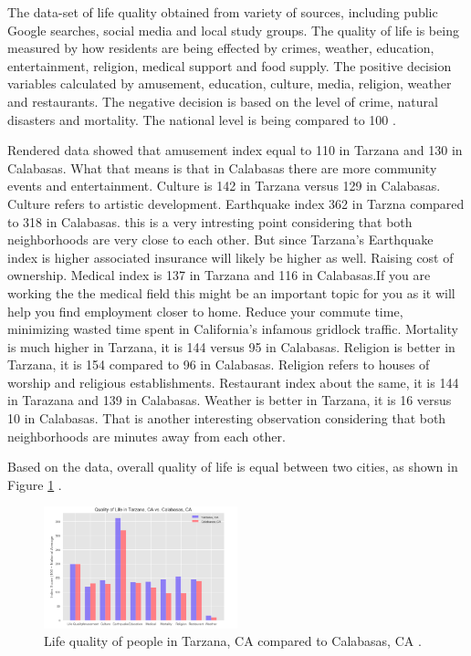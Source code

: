 \documentclass[sigconf]{acmart}
\begin{document}
The data-set of life quality obtained from variety of sources, including public Google searches, social media and local study groups. The quality of life is being measured by how residents are being effected by crimes, weather, education, entertainment, religion, medical support and food supply.    
The positive decision variables calculated by amusement, education, culture, media, religion, weather and restaurants. The negative decision is based on the level of crime, natural disasters and mortality. The  national level is being compared to 100 \cite{clr}.   

Rendered data showed that amusement index equal to 110 in Tarzana and 130 in Calabasas. What that means is that in Calabasas there are more community events and entertainment. Culture is 142 in Tarzana versus 129 in Calabasas. Culture refers to artistic development. Earthquake index 362 in Tarzna compared to 318 in Calabasas. this is a very intresting point considering that both neighborhoods are very close to each other. But since Tarzana's Earthquake index is higher associated insurance will likely be higher as well.  Raising cost of ownership. Medical index is 137 in Tarzana and 116 in Calabasas.If you are working the the medical field this might be an important topic for you as it will help you find employment closer to home. Reduce your commute time, minimizing wasted time spent in California's infamous gridlock traffic. Mortality is much higher in Tarzana, it is 144 versus 95 in Calabasas. Religion is better in Tarzana, it is 154 compared to 96 in Calabasas. Religion refers to houses of worship and religious establishments. Restaurant index about the same, it is 144 in Tarazana and 139 in Calabasas. Weather is better in Tarzana, it is 16 versus 10 in Calabasas. That is another interesting observation considering that both neighborhoods are minutes away from each other.

Based on the data, overall quality of life is equal between two cities, as shown in Figure \ref{fig:figure3} \cite{md}.

\begin{figure}
  \centering
  \includegraphics[width=0.5\textwidth]{images/figure3.png}
  \caption{Life quality of people in Tarzana, CA compared to Calabasas, CA  \cite{md}.} \label{fig:figure3} 
\end{figure}
\end{document}
